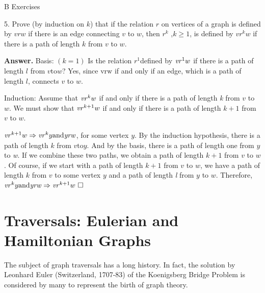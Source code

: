 \documentclass[10pt,]{book}
\theoremstyle{plain}
\theoremstyle{definition}
\theoremstyle{definition}
\theoremstyle{definition}
\theoremstyle{definition}
\theoremstyle{definition}
\numberwithin{equation}{section}
\begin{document}
\hypertarget{exercisegroup-4}{}\typeout{************************************************}
\typeout{************************************************}
B Exercises%
\begin{exercisegroup}
\item[5.]\hypertarget{exercise-20}{} Prove (by induction on \(k\)) that if the relation \(r\) on vertices of a graph is defined by \(v r w\) if there is an edge connecting
\(v\) to \(w\), then \(r^k\) ,\(k \geq  1\), is defined by \(v r^kw\) if there is a path of length \(k\) from \(v\) to
\(w\).%
\par\smallskip
\par\smallskip
\noindent\textbf{Answer.}\hypertarget{answer-5}{}\quad
 Basis: \((k=1)\) Is the relation \(r^1\)defined by \(\text{\textit{vr}}^1w\) if there is a path of length \(l\) from \(v \text{to} w\)? Yes, since
\textit{ \(\text{vrw}\)} if and only if an edge, which is a path of length \(l\), connects \(v\) to \(w\).%
\par
Induction: Assume that \(\text{\textit{vr}}^kw\) if and only if there is a path of length \textit{ k }from \(v\) to \(w\). We must show
that \(\text{\textit{vr}}^{k+1}w\) if and only if there is a path of length \(k+1\) from \(v\) to \(w\).%
\par

\(\text{\textit{vr}}^{k+1}w\Rightarrow \text{\textit{vr}}^ky \text{and} \text{\textit{yrw}}\), for some vertex \(y\). By the induction
hypothesis, there is a path of length \(k\) from \(v \text{to} y\). And by the basis, there is a path of length one from \(y\) to \textit{
w}. If we combine these two paths, we obtain a path of length \(k+1\) from \(v\) to \(w\). Of course, if we start with a path of length
\(k+1\) from \(v\) to \(w\), we have a path of length \(k\) from \(v\) to some vertex \(y\) and a path of length\textit{
 l} from \(y\) to \(w\). Therefore, \(\text{\textit{vr}}^ky \text{and} \text{\textit{yrw}}\Rightarrow \text{\textit{vr}}^{k+1}w\text{
   }\square\)
%
\end{exercisegroup}
\par\smallskip\noindent
\typeout{************************************************}
\typeout{************************************************}
\section[Traversals: Eulerian and Hamiltonian Graphs]{Traversals: Eulerian and Hamiltonian Graphs}\label{s-traversals}
\typeout{************************************************}
\typeout{************************************************}
The subject of graph traversals has a long history. In fact, the solution by Leonhard Euler (Switzerland, 1707-83) of the Koenigsberg Bridge
Problem is considered by many to represent the birth of graph theory.%
\typeout{************************************************}
\typeout{************************************************}
\end{document}
